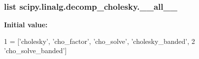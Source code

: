 \subsubsection[{\+\_\+\+\_\+all\+\_\+\+\_\+}]{\setlength{\rightskip}{0pt plus 5cm}list scipy.\+linalg.\+decomp\+\_\+cholesky.\+\_\+\+\_\+all\+\_\+\+\_\+}\label{namespacescipy_1_1linalg_1_1decomp__cholesky_aefa0f31ab2cb61c54454425821b04ff9}
{\bfseries Initial value\+:}
\begin{DoxyCode}
1 = [\textcolor{stringliteral}{'cholesky'}, \textcolor{stringliteral}{'cho\_factor'}, \textcolor{stringliteral}{'cho\_solve'}, \textcolor{stringliteral}{'cholesky\_banded'},
2             \textcolor{stringliteral}{'cho\_solve\_banded'}]
\end{DoxyCode}
